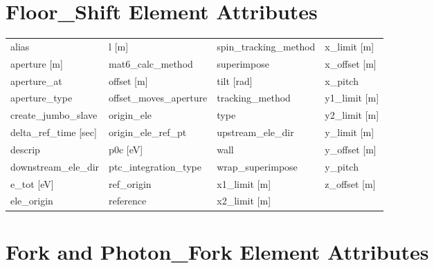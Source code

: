  \section{Floor_Shift Element Attributes}
 \label{s:list.floor.shift}
 
 \begin{tabular}{llll} \toprule
alias                            & l [m]                            & spin_tracking_method             & x_limit [m]                      \\
aperture [m]                     & mat6_calc_method                 & superimpose                      & x_offset [m]                     \\
aperture_at                      & offset [m]                       & tilt [rad]                       & x_pitch                          \\
aperture_type                    & offset_moves_aperture            & tracking_method                  & y1_limit [m]                     \\
create_jumbo_slave               & origin_ele                       & type                             & y2_limit [m]                     \\
delta_ref_time [sec]             & origin_ele_ref_pt                & upstream_ele_dir                 & y_limit [m]                      \\
descrip                          & p0c [eV]                         & wall                             & y_offset [m]                     \\
downstream_ele_dir               & ptc_integration_type             & wrap_superimpose                 & y_pitch                          \\
e_tot [eV]                       & ref_origin                       & x1_limit [m]                     & z_offset [m]                     \\
ele_origin                       & reference                        & x2_limit [m]                     &                                  \\
 \bottomrule
 \end{tabular}
 \vfill
 
 \section{Fork and Photon_Fork Element Attributes}
 \label{s:list.fork}
 
